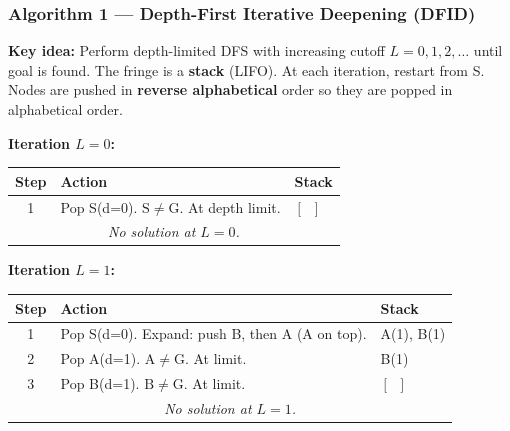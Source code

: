 \documentclass[12pt, a4paper]{article}
\begin{document}
\subsubsection*{Algorithm 1 — Depth-First Iterative Deepening (DFID)}

\textbf{Key idea:} Perform depth-limited DFS with increasing cutoff $L=0,1,2,\ldots$ until goal is found. The fringe is a \textbf{stack} (LIFO). At each iteration, restart from S. Nodes are pushed in \textbf{reverse alphabetical} order so they are popped in alphabetical order.

\vspace{0.4em}

\noindent\textbf{Iteration $L = 0$:}
\begin{center}
\renewcommand{\arraystretch}{1.2}
\begin{tabular}{c|l|p{8cm}}
\toprule
\textbf{Step} & \textbf{Action} & \textbf{Stack} \\
\midrule
1 & Pop S(d=0). $\mathrm{S} \neq \mathrm{G}$. At depth limit. & $[\;\;]$ \\
\bottomrule
\multicolumn{3}{c}{\textit{No solution at $L=0$.}} \\
\end{tabular}
\end{center}

\vspace{0.5em}

\noindent\textbf{Iteration $L = 1$:}
\begin{center}
\renewcommand{\arraystretch}{1.2}
\begin{tabular}{c|l|p{8cm}}
\toprule
\textbf{Step} & \textbf{Action} & \textbf{Stack} \\
\midrule
1 & Pop S(d=0). Expand: push B, then A (A on top). & A(1), B(1) \\
2 & Pop A(d=1). $\mathrm{A} \neq \mathrm{G}$. At limit. & B(1) \\
3 & Pop B(d=1). $\mathrm{B} \neq \mathrm{G}$. At limit. & $[\;\;]$ \\
\bottomrule
\multicolumn{3}{c}{\textit{No solution at $L=1$.}} \\
\end{tabular}
\end{center}

\vspace{0.5em}
\end{document}
